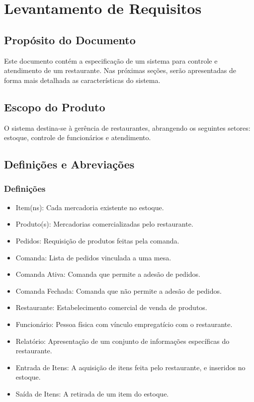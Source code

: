 \section{Levantamento de Requisitos}\label{requisitos}

\subsection{Propósito do Documento}
Este documento contém a especificação de um sistema para controle e atendimento de um restaurante. Nas próximas seções, serão apresentadas de forma mais detalhada as características do sistema.



\subsection{Escopo do Produto}
O sistema destina-se à gerência de restaurantes, abrangendo os seguintes setores: estoque, controle de funcionários e atendimento.



\subsection{Definições e Abreviações}
	\subsubsection{Definições}
	\begin{itemize}
	\item[] Item(ns): Cada mercadoria existente no estoque.
	\item[] Produto(s): Mercadorias comercializadas pelo restaurante.
	\item[] Pedidos: Requisição de produtos feitas pela comanda.
	\item[] Comanda: Lista de pedidos vinculada a uma mesa.
	\item[] Comanda Ativa: Comanda que permite a adesão de pedidos.
	\item[] Comanda Fechada: Comanda que não permite a adesão de pedidos.
	\item[] Restaurante: Estabelecimento comercial de venda de produtos.
	\item[] Funcionário: Pessoa física com vínculo empregatício com o restaurante.
	\item[] Relatório: Apresentação de um conjunto de informações específicas do restaurante.
	\item[] Entrada de Itens: A aquisição de itens feita pelo restaurante, e inseridos no estoque.
	\item[] Saída de Itens: A retirada de um item do estoque.
	\end{itemize}

